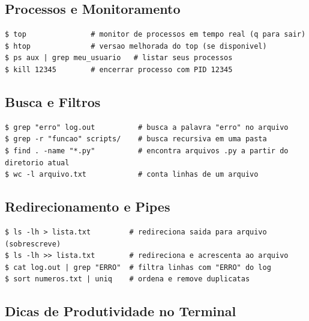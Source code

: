 \documentclass[11pt, a4paper]{article}
\begin{document}
\subsection{Processos e Monitoramento}

\begin{lstlisting}[style=terminal]
$ top               # monitor de processos em tempo real (q para sair)
$ htop              # versao melhorada do top (se disponivel)
$ ps aux | grep meu_usuario   # listar seus processos
$ kill 12345        # encerrar processo com PID 12345
\end{lstlisting}

\subsection{Busca e Filtros}

\begin{lstlisting}[style=terminal]
$ grep "erro" log.out          # busca a palavra "erro" no arquivo
$ grep -r "funcao" scripts/    # busca recursiva em uma pasta
$ find . -name "*.py"          # encontra arquivos .py a partir do diretorio atual
$ wc -l arquivo.txt            # conta linhas de um arquivo
\end{lstlisting}

\subsection{Redirecionamento e Pipes}

\begin{lstlisting}[style=terminal]
$ ls -lh > lista.txt         # redireciona saida para arquivo (sobrescreve)
$ ls -lh >> lista.txt        # redireciona e acrescenta ao arquivo
$ cat log.out | grep "ERRO"  # filtra linhas com "ERRO" do log
$ sort numeros.txt | uniq    # ordena e remove duplicatas
\end{lstlisting}

\subsection{Dicas de Produtividade no Terminal}
\end{document}
